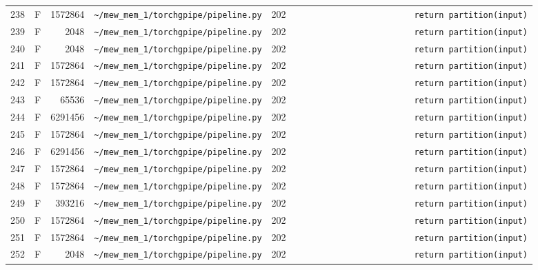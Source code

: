 \documentclass{article}
\begin{document}
\begin{longtable}{r l r p{6.5cm} r p{7.0cm}}
238 & F & 1572864 & \lstinline|~/mew_mem_1/torchgpipe/pipeline.py| & 202 & \lstinline|                        return partition(input)| \\
239 & F & 2048 & \lstinline|~/mew_mem_1/torchgpipe/pipeline.py| & 202 & \lstinline|                        return partition(input)| \\
240 & F & 2048 & \lstinline|~/mew_mem_1/torchgpipe/pipeline.py| & 202 & \lstinline|                        return partition(input)| \\
241 & F & 1572864 & \lstinline|~/mew_mem_1/torchgpipe/pipeline.py| & 202 & \lstinline|                        return partition(input)| \\
242 & F & 1572864 & \lstinline|~/mew_mem_1/torchgpipe/pipeline.py| & 202 & \lstinline|                        return partition(input)| \\
243 & F & 65536 & \lstinline|~/mew_mem_1/torchgpipe/pipeline.py| & 202 & \lstinline|                        return partition(input)| \\
244 & F & 6291456 & \lstinline|~/mew_mem_1/torchgpipe/pipeline.py| & 202 & \lstinline|                        return partition(input)| \\
245 & F & 1572864 & \lstinline|~/mew_mem_1/torchgpipe/pipeline.py| & 202 & \lstinline|                        return partition(input)| \\
246 & F & 6291456 & \lstinline|~/mew_mem_1/torchgpipe/pipeline.py| & 202 & \lstinline|                        return partition(input)| \\
247 & F & 1572864 & \lstinline|~/mew_mem_1/torchgpipe/pipeline.py| & 202 & \lstinline|                        return partition(input)| \\
248 & F & 1572864 & \lstinline|~/mew_mem_1/torchgpipe/pipeline.py| & 202 & \lstinline|                        return partition(input)| \\
249 & F & 393216 & \lstinline|~/mew_mem_1/torchgpipe/pipeline.py| & 202 & \lstinline|                        return partition(input)| \\
250 & F & 1572864 & \lstinline|~/mew_mem_1/torchgpipe/pipeline.py| & 202 & \lstinline|                        return partition(input)| \\
251 & F & 1572864 & \lstinline|~/mew_mem_1/torchgpipe/pipeline.py| & 202 & \lstinline|                        return partition(input)| \\
252 & F & 2048 & \lstinline|~/mew_mem_1/torchgpipe/pipeline.py| & 202 & \lstinline|                        return partition(input)| \\

\end{longtable}
\end{document}
